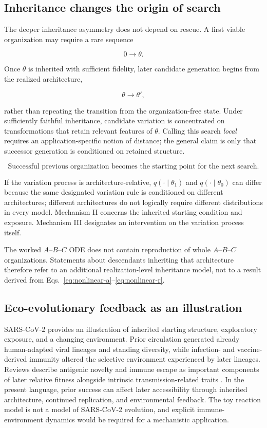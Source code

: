 \documentclass[11pt,a4paper]{article}
\begin{document}
\subsection{Inheritance changes the origin of search}

The deeper inheritance asymmetry does not depend on rescue. A first viable organization may require a rare sequence

\[
0\longrightarrow\theta.
\]

Once $\theta$ is inherited with sufficient fidelity, later candidate generation begins from the realized architecture,

\[
\theta\longrightarrow\theta',
\]

rather than repeating the transition from the organization-free state. Under sufficiently faithful inheritance, candidate variation is concentrated on transformations that retain relevant features of $\theta$. Calling this search \emph{local} requires an application-specific notion of distance; the general claim is only that successor generation is conditioned on retained structure.

\[
\boxed{\text{Successful previous organization becomes the starting point for the next search.}}
\]

If the variation process is architecture-relative, $q(\cdot\mid\theta_1)$ and $q(\cdot\mid\theta_0)$ can differ because the same designated variation rule is conditioned on different architectures; different architectures do not logically require different distributions in every model. Mechanism II concerns the inherited starting condition and exposure. Mechanism III designates an intervention on the variation process itself.

The worked $A$--$B$--$C$ ODE does not contain reproduction of whole $A$--$B$--$C$ organizations. Statements about descendants inheriting that architecture therefore refer to an additional realization-level inheritance model, not to a result derived from Eqs.~\eqref{eq:nonlinear-a}--\eqref{eq:nonlinear-r}.

\subsection{Eco-evolutionary feedback as an illustration}

SARS-CoV-2 provides an illustration of inherited starting structure, exploratory exposure, and a changing environment. Prior circulation generated already human-adapted viral lineages and standing diversity, while infection- and vaccine-derived immunity altered the selective environment experienced by later lineages. Reviews describe antigenic novelty and immune escape as important components of later relative fitness alongside intrinsic transmission-related traits \citep{Carabelli2023}. In the present language, prior success can affect later accessibility through inherited architecture, continued replication, and environmental feedback. The toy reaction model is not a model of SARS-CoV-2 evolution, and explicit immune-environment dynamics would be required for a mechanistic application.
\end{document}
